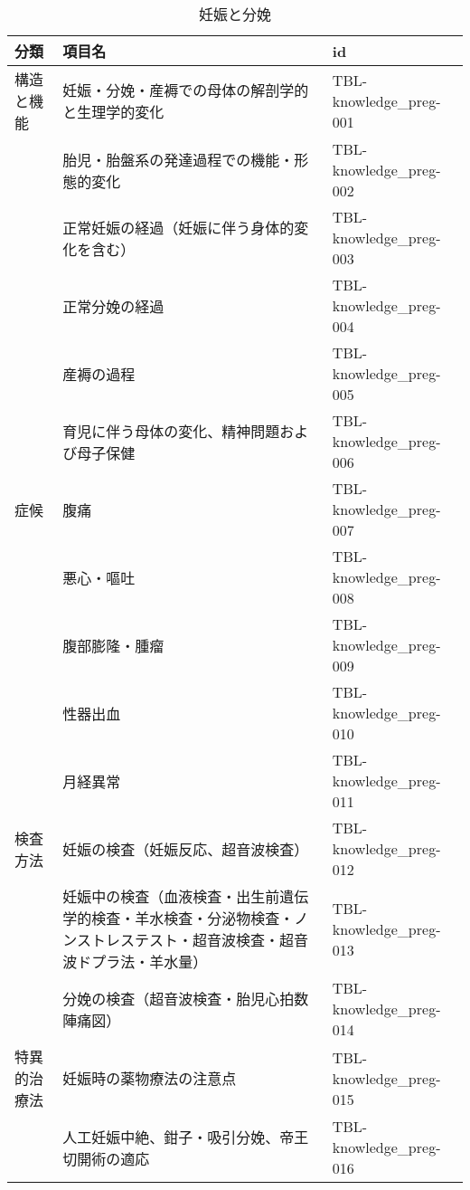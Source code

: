 \begin{xltabular}{\linewidth}{XXX}
\caption{\label{tbl:knowledge_preg}妊娠と分娩} \\
\toprule
分類 & 項目名 & id \\
\midrule
\endhead
構造と機能 & 妊娠・分娩・産褥での母体の解剖学的と生理学的変化 & TBL-knowledge_preg-001 \\
 & 胎児・胎盤系の発達過程での機能・形態的変化 & TBL-knowledge_preg-002 \\
 & 正常妊娠の経過（妊娠に伴う身体的変化を含む） & TBL-knowledge_preg-003 \\
 & 正常分娩の経過 & TBL-knowledge_preg-004 \\
 & 産褥の過程 & TBL-knowledge_preg-005 \\
 & 育児に伴う母体の変化、精神問題および母子保健 & TBL-knowledge_preg-006 \\
症候 & 腹痛 & TBL-knowledge_preg-007 \\
 & 悪心・嘔吐 & TBL-knowledge_preg-008 \\
 & 腹部膨隆・腫瘤 & TBL-knowledge_preg-009 \\
 & 性器出血 & TBL-knowledge_preg-010 \\
 & 月経異常 & TBL-knowledge_preg-011 \\
検査方法 & 妊娠の検査（妊娠反応、超音波検査） & TBL-knowledge_preg-012 \\
 & 妊娠中の検査（血液検査・出生前遺伝学的検査・羊水検査・分泌物検査・ノンストレステスト・超音波検査・超音波ドプラ法・羊水量） & TBL-knowledge_preg-013 \\
 & 分娩の検査（超音波検査・胎児心拍数陣痛図） & TBL-knowledge_preg-014 \\
特異的治療法 & 妊娠時の薬物療法の注意点 & TBL-knowledge_preg-015 \\
 & 人工妊娠中絶、鉗子・吸引分娩、帝王切開術の適応 & TBL-knowledge_preg-016 \\
\bottomrule
\end{xltabular}

